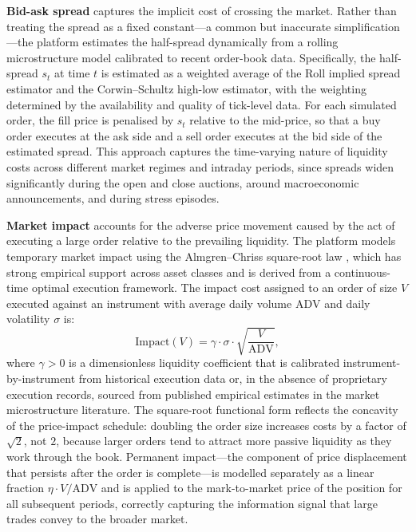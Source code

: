 \documentclass[12pt,openany]{book}
\numberwithin{equation}{chapter}
\theoremstyle{plain}
\theoremstyle{definition}
\theoremstyle{remark}
\begin{document}
\textbf{Bid-ask spread} captures the implicit cost of crossing the market. Rather than treating the spread as a fixed constant---a common but inaccurate simplification---the platform estimates the half-spread dynamically from a rolling microstructure model calibrated to recent order-book data. Specifically, the half-spread $s_t$ at time $t$ is estimated as a weighted average of the Roll implied spread estimator \citep{Roll1984} and the Corwin--Schultz high-low estimator, with the weighting determined by the availability and quality of tick-level data. For each simulated order, the fill price is penalised by $s_t$ relative to the mid-price, so that a buy order executes at the ask side and a sell order executes at the bid side of the estimated spread. This approach captures the time-varying nature of liquidity costs across different market regimes and intraday periods, since spreads widen significantly during the open and close auctions, around macroeconomic announcements, and during stress episodes.

\textbf{Market impact} accounts for the adverse price movement caused by the act of executing a large order relative to the prevailing liquidity. The platform models temporary market impact using the Almgren--Chriss square-root law \citep{AlmgrenChriss2001}, which has strong empirical support across asset classes and is derived from a continuous-time optimal execution framework. The impact cost assigned to an order of size $V$ executed against an instrument with average daily volume $\text{ADV}$ and daily volatility $\sigma$ is:
\begin{equation}
    \text{Impact}(V) = \gamma \cdot \sigma \cdot \sqrt{\frac{V}{\text{ADV}}},
\end{equation}
where $\gamma > 0$ is a dimensionless liquidity coefficient that is calibrated instrument-by-instrument from historical execution data or, in the absence of proprietary execution records, sourced from published empirical estimates in the market microstructure literature. The square-root functional form reflects the concavity of the price-impact schedule: doubling the order size increases costs by a factor of $\sqrt{2}$, not $2$, because larger orders tend to attract more passive liquidity as they work through the book. Permanent impact---the component of price displacement that persists after the order is complete---is modelled separately as a linear fraction $\eta \cdot V / \text{ADV}$ and is applied to the mark-to-market price of the position for all subsequent periods, correctly capturing the information signal that large trades convey to the broader market.
\end{document}
